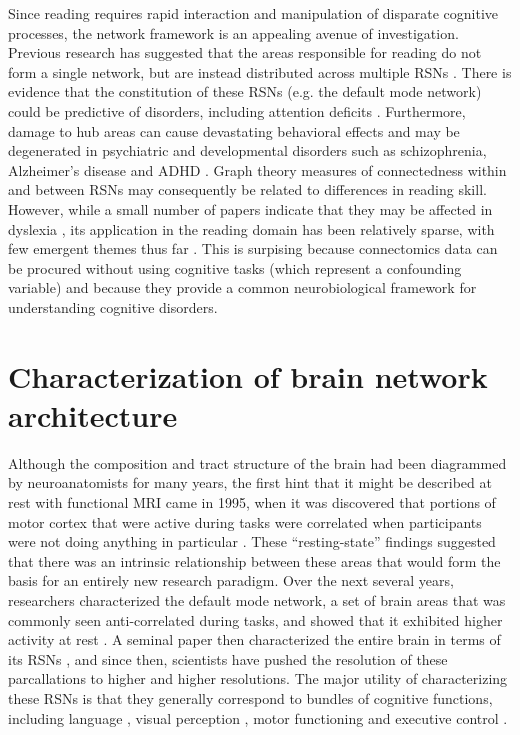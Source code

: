 Since reading requires rapid interaction and manipulation of disparate cognitive processes, the network framework is an appealing avenue of investigation. Previous research has suggested that the areas responsible for reading do not form a single network, but are instead distributed across multiple RSNs \citep{Vogel2013}. There is evidence that the constitution of these RSNs (e.g. the default mode network) could be predictive of disorders, including attention deficits \citep{Uddin2008}. Furthermore, damage to hub areas can cause devastating behavioral effects \citep{Warren2014} and may be degenerated in psychiatric and developmental disorders such as schizophrenia, Alzheimer's disease and ADHD \citep{Stam2014}. Graph theory measures of connectedness within and between RSNs may consequently be related to differences in reading skill. However, while a small number of papers indicate that they may be affected in dyslexia \citep{Qi2016, Finn2014}, its application in the reading domain has been relatively sparse, with few emergent themes thus far \citep{Cao2016}. This is surpising because connectomics data can be procured without using cognitive tasks (which represent a confounding variable) and because they provide a common neurobiological framework for understanding cognitive disorders.

\section{Characterization of brain network architecture}

Although the composition and tract structure of the brain had been diagrammed by neuroanatomists for many years, the first hint that it might be described at rest with functional MRI came in 1995, when it was discovered that portions of motor cortex that were active during tasks were correlated when participants were not doing anything in particular \citep{Biswal1995}. These ``resting-state'' findings suggested that there was an intrinsic relationship between these areas that would form the basis for an entirely new research paradigm. Over the next several years, researchers characterized the default mode network, a set of brain areas that was commonly seen anti-correlated during tasks, and showed that it exhibited higher activity at rest \citep{Greicius2003}. A seminal paper then characterized the entire brain in terms of its RSNs \citep{Yeo2011}, and since then, scientists have pushed the resolution of these parcallations to higher and higher resolutions. The major utility of characterizing these RSNs is that they generally correspond to bundles of cognitive functions, including language \citep{Cordes2000, Hampson2002}, visual perception \citep{Simmons2012}, motor functioning \citep{Biswal1995} and executive control \citep{Seeley2007}. 

